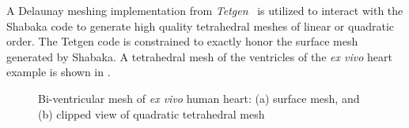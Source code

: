 A Delaunay meshing implementation from \textit{Tetgen}~\cite{tetgen} is utilized to interact with the Shabaka code to generate high quality tetrahedral meshes of linear or quadratic order. The Tetgen code is constrained to exactly honor the surface mesh generated by Shabaka. A tetrahedral mesh of the ventricles of the \textit{ex vivo} heart example is shown in .

\begin{figure}
\centering
{}
%
\caption{Bi-ventricular mesh of \textit{ex vivo} human heart: (a) surface mesh, and (b) clipped view of quadratic tetrahedral mesh}
\label{fig:tetmesh}
\end{figure}

